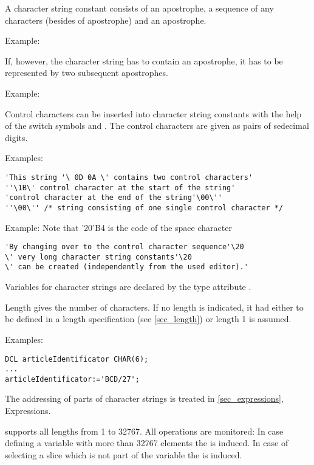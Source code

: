 A character string constant consists of an apostrophe, a sequence of any
characters (besides of apostrophe) and an apostrophe.

Example: 

If, however, the character string has to contain an apostrophe, it has
to be represented by two subsequent apostrophes.

Example: 

Control characters can be inserted into character string constants with
the help of the switch symbols  and 
. 
 The control characters are given as pairs of sedecimal digits.

Examples:

\begin{lstlisting}[emphstyle=\ttfamily]
'This string '\ 0D 0A \' contains two control characters'
''\1B\' control character at the start of the string'
'control character at the end of the string'\00\''
''\00\'' /* string consisting of one single control character */
\end{lstlisting}

Example: Note that '20'B4 is the code of the space character

\begin{lstlisting}
'By changing over to the control character sequence'\20
\' very long character string constants'\20
\' can be created (independently from the used editor).'
\end{lstlisting}

Variables for character strings are declared by the type attribute
.

\begin{grammarframe}
\end{grammarframe}

Length gives the number of characters. If no length is indicated, it had
either to be defined in a length specification (see \ref{sec_length}) or length 1 is
assumed.

Examples:

\begin{lstlisting}
DCL articleIdentificator CHAR(6);
...
articleIdentificator:='BCD/27';
\end{lstlisting}

The addressing of parts of character strings is treated in
 \ref{sec_expressions}, Expressions.

\OpenPEARL{} supports all lengths from 1 to 32767.
All operations are monitored:
In case defining a  variable with more than 32767 elements the
 is induced.
In case of selecting a slice which is not part of the  variable the 
 is induced.

